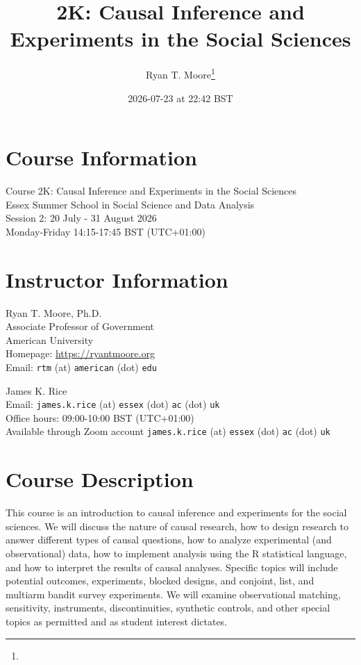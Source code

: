 \documentclass[11pt]{article}
\title{2K: Causal Inference and Experiments in the Social Sciences}
\author{Ryan T. Moore\footnote{\rtmaddr}}
\date{2026-07-23 at 22:42 BST}
\newcommand{\firstdate}{20 }
\newcommand{\lastdate}{31 }
\newcommand{\thisyear}{2026}
\begin{document}
\maketitle

\section*{Course Information}
Course 2K: Causal Inference and Experiments in the Social Sciences\\
Essex Summer School in Social Science and Data Analysis\\
Session 2: \firstdate July - \lastdate August \thisyear\\
Monday-Friday 14:15-17:45 BST (UTC+01:00)

\section*{Instructor Information}
Ryan T. Moore, Ph.D. \\
Associate Professor of Government\\
American University\\
Homepage: \url{https://ryantmoore.org} \\
Email: {\tt rtm} (at) {\tt american} (dot) {\tt edu} \\

\vspace{.1in}

\noindent James K. Rice\\
Email: {\tt james.k.rice} (at) {\tt essex} (dot) {\tt ac} (dot) {\tt uk} \\
Office hours: 09:00-10:00 BST (UTC+01:00) \\
Available through Zoom account {\tt james.k.rice} (at) {\tt essex} (dot) {\tt ac} (dot) {\tt uk}


\section*{Course Description}

This course is an introduction to causal inference and experiments for the social 
sciences. We will discuss the nature of causal research, how to design research 
to answer different types of causal questions, how to analyze experimental (and 
observational) data, how to implement analysis using the R statistical language, 
and how to interpret the results of causal analyses. Specific topics will include 
potential outcomes, experiments, blocked designs, and conjoint, list, and 
multiarm bandit survey experiments. We will examine observational matching, 
sensitivity, instruments, discontinuities, synthetic controls, and other special 
topics as permitted and as student interest dictates.
\end{document}
